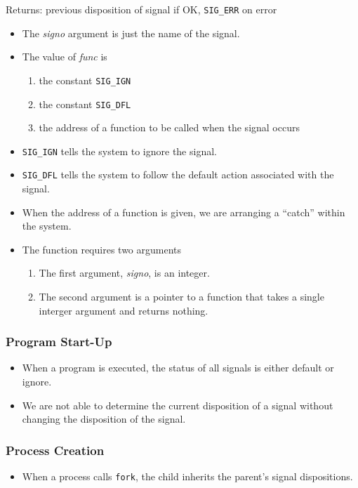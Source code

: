 \documentclass[]{article} \usepackage[all]{xy}
\newcommand{\code}{\texttt}
\begin{document}
Returns: previous disposition of signal if OK, \code{SIG\_ERR} on error

\begin{itemize}
\item The \emph{signo} argument is just the name of the signal.
\item The value of \emph{func} is
\begin{enumerate}
\item the constant \code{SIG\_IGN}
\item the constant \code{SIG\_DFL}
\item the address of a function to be called when the signal occurs
\end{enumerate}
\item \code{SIG\_IGN} tells the system to ignore the signal.
\item \code{SIG\_DFL} tells the system to follow the default action associated
with the signal.
\item When the address of a function is given, we are arranging a ``catch''
within the system.
\item The function requires two arguments
\begin{enumerate}
\item The first argument, \emph{signo}, is an integer.
\item The second argument is a pointer to a function that takes a single
interger argument and returns nothing.
\end{enumerate}
\end{itemize}

\subsubsection*{Program Start-Up}
\begin{itemize}
\item When a program is executed, the status of all signals is either default or
ignore.
\item We are not able to determine the current disposition of a signal without
changing the disposition of the signal.
\end{itemize}

\subsubsection*{Process Creation}
\begin{itemize}
\item When a process calls \code{fork}, the child inherits the parent's signal
dispositions.
\end{itemize}
\end{document}
